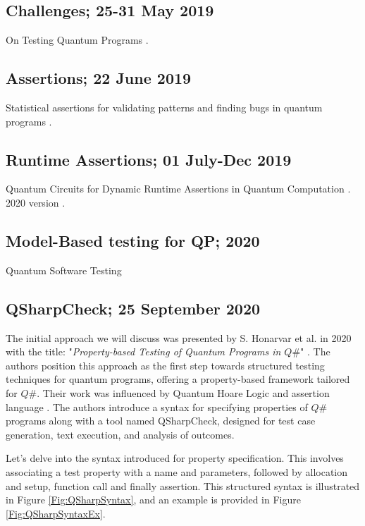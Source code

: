 \begin{itemize}
\subsection{Challenges; 25-31 May 2019}
On Testing Quantum Programs \cite{miranskyy2019testing}.

\vspace{15pt}
\subsection{Assertions; 22 June 2019}
Statistical assertions for validating patterns and finding bugs in quantum programs \cite{huang2019statistical}.

\vspace{15pt}
\subsection{Runtime Assertions; 01 July-Dec 2019}
Quantum Circuits for Dynamic Runtime Assertions in Quantum Computation \cite{zhou2019quantum}. 2020 version \cite{liu2020quantum}.

\vspace{15pt}
\subsection{Model-Based testing for QP; 2020}
Quantum Software Testing \cite{usaola2020quantum}

\vspace{15pt}
\subsection{QSharpCheck; 25 September 2020}
\label{Ch3.2.1:QSharpCheck}
The initial approach we will discuss was presented by S. Honarvar et al. in 2020 with the title: "\textit{Property-based Testing of Quantum Programs in $Q\#$}" \cite{honarvar2020property}. The authors position this approach as the first step towards structured testing techniques for quantum programs, offering a property-based framework tailored for $Q\#$. Their work was influenced by Quantum Hoare Logic \cite{ying2012floyd} and assertion language \cite{huang2019statistical}. The authors introduce a syntax for specifying properties of $Q\#$ programs along with a tool named QSharpCheck, designed for test case generation, text execution, and analysis of outcomes.\newline

Let's delve into the syntax introduced for property specification. This involves associating a test property with a name and parameters, followed by allocation and setup, function call and finally assertion. This structured syntax is illustrated in Figure \ref{Fig:QSharpSyntax}, and an example is provided in Figure \ref{Fig:QSharpSyntaxEx}.


\end{itemize}
